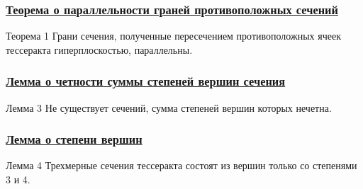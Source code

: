 \documentclass[10pt,pdf,hyperref={unicode}]{beamer}
\begin{document}
\begin{frame}
	\frametitle{\hyperlink{theorem1}{Теорема о параллельности граней противоположных сечений}}
	\hypertarget{theorem1_back}{}
	\begin{block}{Теорема 1}
		Грани сечения, полученные пересечением противоположных ячеек тессеракта гиперплоскостью, параллельны.
	\end{block}
\end{frame}
\begin{frame}
	\frametitle{\hyperlink{evenodd}{Лемма о четности суммы степеней вершин сечения}}
	\hypertarget{evenodd_back}{}
	\begin{block}{Лемма 3}
		Не существует сечений, сумма степеней вершин которых нечетна.
	\end{block}
\end{frame}
\begin{frame}
	\frametitle{\hyperlink{stepen}{Лемма о степени вершин}}
	\hypertarget{stepen_back}{}
	\begin{block}{Лемма 4}
		Трехмерные сечения тессеракта состоят из вершин только со степенями 3 и 4.
	\end{block}
\end{frame}
\end{document}
